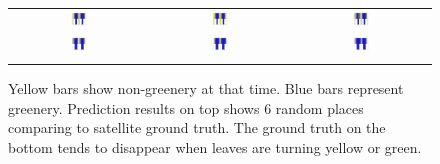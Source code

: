 \begin{figure}[th!]
\begin{center}
\begin{tabular}{ccc}
\includegraphics[width=0.14\textwidth]{bar/8560.jpg} &
\includegraphics[width=0.14\textwidth]{bar/8561.jpg} &
\includegraphics[width=0.14\textwidth]{bar/8881.jpg} \\
\includegraphics[width=0.14\textwidth]{bar/8911.jpg} &
\includegraphics[width=0.14\textwidth]{bar/9705.jpg} &
\includegraphics[width=0.14\textwidth]{bar/10816.jpg} \\
\\
\end{tabular}
\end{center}
\vspace{-28pt}
\caption{Yellow bars show non-greenery at that time. Blue bars represent greenery. Prediction results on top shows 6 random places comparing to satellite ground truth. The ground truth on the bottom tends to disappear when leaves are turning yellow or green.}
\label{fig:placeinbar}
\vspace{-24pt}
\end{figure}

